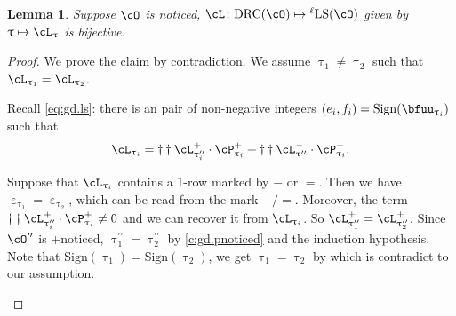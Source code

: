\documentclass[12pt,a4paper]{amsart}
\numberwithin{equation}{section}
\newtheorem{lem}[thm]{Lemma}
\theoremstyle{remark}
\def\ssign{\mathrm{Sign}}
\def\drc{\mathrm{DRC}}
\def\LLS{\mathrm{{}^{\ell} LS}}
\def\cOpp{\cO^{\prime\prime}}
\def\pcL{\cL^+}
\def\ncL{\cL^-}
\def\pcP{\cP^+}
\def\ncP{\cP^-}
\def\uptaup{\uptau^{\prime}}
\def\uptaupp{\uptau^{\prime\prime}}
\begin{document}
\begin{lem}\label{c:noticed.bij}
 Suppose $\cO$ is noticed, $\cL \colon \drc(\cO)\mapsto \LLS(\cO)$ given by
 $\uptau\mapsto \cL_{\uptau}$ is bijective.
\end{lem}
\begin{proof}
We prove the claim by contradiction. We assume $\uptau_{1}\neq \uptau_{2}$ such
that $\cL_{\uptau_{1}}=\cL_{\uptau_{2}}$.


Recall \eqref{eq:gd.ls}: there is an pair of non-negative integers
$(e_{i},f_{i})=\ssign(\bfuu_{\uptau_{i}})$ such that
\[
  \cL_{\uptau_{i}} = \dagger\dagger \pcL_{\uptaupp_{i}}\cdot \pcP_{\uptau_{i}}
  + \dagger\dagger \ncL_{\uptaupp} \cdot \ncP_{\uptau_{i}}.
\]

\begin{enumPF}
  \item
Suppose that $\cL_{\uptau_{i}}$ contains a 1-row marked by $-$ or $=$. Then we
have
$\upepsilon_{\uptau_{1}}=\upepsilon_{\uptau_{2}}$, which can be read from the mark $-/=$.
Moreover, the term
$\dagger\dagger\pcL_{\uptaupp_{i}}\cdot \pcP_{\uptau_{i}}\neq 0$ and we can
recover it from $\cL_{\uptau_{i}}$. So $\pcL_{\uptaupp_{1}} = \pcL_{\uptaupp_{2}}$.
Since $\cOpp$ is +noticed, $\uptaupp_{1}=\uptaupp_{2}$ by
\eqref{c:gd.pnoticed} and the induction hypothesis.
Note that $\ssign(\uptau_{1})=\ssign(\uptau_{2})$, we get
$\uptau_{1}=\uptau_{2}$ by  which is contradict to our assumption.



\end{enumPF}
\end{proof}
\end{document}
